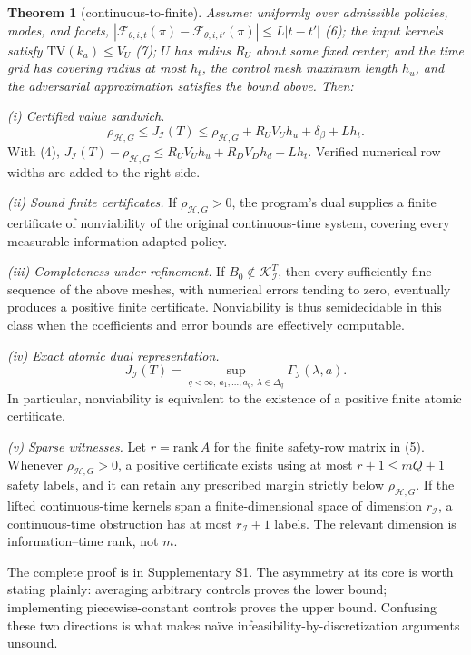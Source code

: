 \documentclass[10pt,twocolumn]{article}
\theoremstyle{plain}
\newtheorem{theorem}{Theorem}
\theoremstyle{definition}
\theoremstyle{remark}
\begin{document}
\begin{theorem}[continuous-to-finite]\label{thm:bridge}
Assume: uniformly over admissible policies, modes, and facets,
\(|\mathcal{F}_{\theta,i,t}(\pi) - \mathcal{F}_{\theta,i,t'}(\pi)| \le
L|t - t'|\) (6); the input kernels satisfy \(\mathrm{TV}(k_a) \le V_U\) (7);
\(U\) has radius \(R_U\) about some fixed center; and the time grid has
covering radius at most \(h_t\), the control mesh maximum length \(h_u\),
and the adversarial approximation satisfies the bound above. Then:
\end{theorem}

\noindent\emph{(i) Certified value sandwich.}
\[
\rho_{\mathcal{H},G} \le J_{\mathcal{I}}(T) \le \rho_{\mathcal{H},G}
+ R_U V_U h_u + \delta_\beta + L h_t.
\tag{8}
\]
With (4), \(J_{\mathcal{I}}(T) - \rho_{\mathcal{H},G} \le R_U V_U h_u + R_D
V_D h_d + L h_t\). Verified numerical row widths are added to the right side.

\noindent\emph{(ii) Sound finite certificates.} If \(\rho_{\mathcal{H},G} > 0\), the
program's dual supplies a finite certificate of nonviability of the original
continuous-time system, covering every measurable information-adapted policy.

\noindent\emph{(iii) Completeness under refinement.} If
\(B_0 \notin \mathcal{K}_{\mathcal{I}}^T\), then every sufficiently fine
sequence of the above meshes, with numerical errors tending to zero,
eventually produces a positive finite certificate. Nonviability is thus
semidecidable in this class when the coefficients and error bounds are
effectively computable.

\noindent\emph{(iv) Exact atomic dual representation.}
\[
J_{\mathcal{I}}(T) = \sup_{q < \infty,\ a_1,\dots,a_q,\
\lambda \in \Delta_q} \Gamma_{\mathcal{I}}(\lambda, a).
\tag{10}
\]
In particular, nonviability is equivalent to the existence of a positive
finite atomic certificate.

\noindent\emph{(v) Sparse witnesses.} Let \(r = \mathrm{rank}\, A\) for the
finite safety-row matrix in (5). Whenever \(\rho_{\mathcal{H},G} > 0\), a
positive certificate exists using at most \(r + 1 \le mQ + 1\) safety labels,
and it can retain any prescribed margin strictly below
\(\rho_{\mathcal{H},G}\). If the lifted continuous-time kernels span a
finite-dimensional space of dimension \(r_{\mathcal{I}}\), a continuous-time
obstruction has at most \(r_{\mathcal{I}} + 1\) labels. The relevant
dimension is information--time rank, not \(m\).

The complete proof is in Supplementary S1. The asymmetry at its core is
worth stating plainly: averaging arbitrary controls proves the lower bound;
implementing piecewise-constant controls proves the upper bound. Confusing
these two directions is what makes na\"ive infeasibility-by-discretization
arguments unsound.
\end{document}
